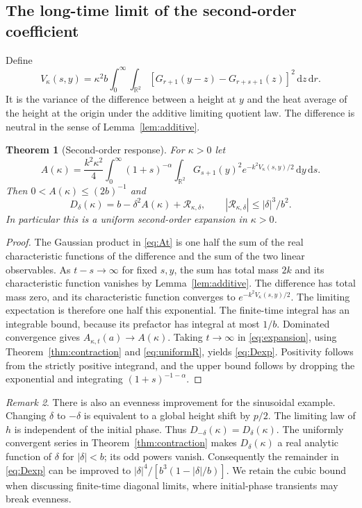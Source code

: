 \documentclass[11pt]{article}
\numberwithin{equation}{section}
\newtheorem{theorem}{Theorem}[section]
\theoremstyle{definition}
\theoremstyle{remark}
\newtheorem{remark}[theorem]{Remark}
\newcommand{\R}{\mathbb R}
\newcommand{\dd}{\,\mathrm d}
\begin{document}
\subsection{The long-time limit of the second-order coefficient}
Define
\begin{equation}\label{eq:V_def}
 V_\kappa(s,y)=\kappa^2b\int_0^\infty\int_{\R^2}
 [G_{r+1}(y-z)-G_{r+s+1}(z)]^2\dd z\dd r.
\end{equation}
It is the variance of the difference between a height at $y$ and the heat average of the height at the origin under the additive limiting quotient law. The difference is neutral in the sense of Lemma~\ref{lem:additive}.
\begin{theorem}[Second-order response]\label{thm:response}
For $\kappa>0$ let
\begin{equation}\label{eq:A}
 A(\kappa)=\frac{k^2\kappa^2}{4}\int_0^\infty(1+s)^{-\alpha}
 \int_{\R^2}G_{s+1}(y)^2 e^{-k^2 V_\kappa(s,y)/2}\dd y\dd s.
\end{equation}
Then $0<A(\kappa)\le (2b)^{-1}$ and
\begin{equation}\label{eq:Dexp}
 \boxed{D_\delta(\kappa)=b-\delta^2 A(\kappa)+\mathcal R_{\kappa,\delta},\qquad
 |\mathcal R_{\kappa,\delta}|\le |\delta|^3/b^2.}
\end{equation}
In particular this is a uniform second-order expansion in $\kappa>0$.
\end{theorem}
\begin{proof}
The Gaussian product in \eqref{eq:At} is one half the sum of the real characteristic functions of the difference and the sum of the two linear observables. As $t-s\to\infty$ for fixed $s,y$, the sum has total mass $2k$ and its characteristic function vanishes by Lemma~\ref{lem:additive}. The difference has total mass zero, and its characteristic function converges to $e^{-k^2 V_\kappa(s,y)/2}$. The limiting expectation is therefore one half this exponential. The finite-time integral has an integrable bound, because its prefactor has integral at most $1/b$. Dominated convergence gives $A_{\kappa,t}(a)\to A(\kappa)$. Taking $t\to\infty$ in \eqref{eq:expansion}, using Theorem~\ref{thm:contraction} and \eqref{eq:uniformR}, yields \eqref{eq:Dexp}. Positivity follows from the strictly positive integrand, and the upper bound follows by dropping the exponential and integrating $(1+s)^{-1-\alpha}$.
\end{proof}
\begin{remark}
There is also an evenness improvement for the sinusoidal example. Changing $\delta$ to $-\delta$ is equivalent to a global height shift by $p/2$. The limiting law of $h$ is independent of the initial phase. Thus $D_{-\delta}(\kappa)=D_\delta(\kappa)$. The uniformly convergent series in Theorem~\ref{thm:contraction} makes $D_\delta(\kappa)$ a real analytic function of $\delta$ for $|\delta|<b$; its odd powers vanish. Consequently the remainder in \eqref{eq:Dexp} can be improved to $|\delta|^4/[b^3(1-|\delta|/b)]$. We retain the cubic bound when discussing finite-time diagonal limits, where initial-phase transients may break evenness.
\end{remark}
\end{document}
